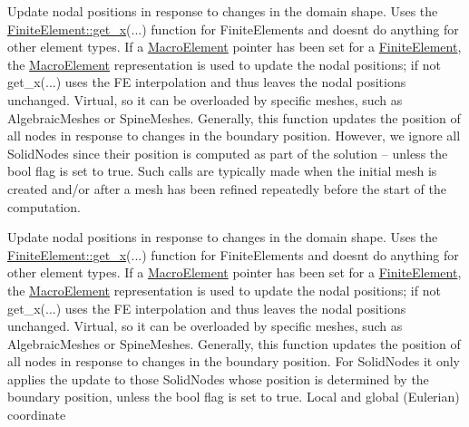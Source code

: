 Update nodal positions in response to changes in the domain shape. Uses the \hyperlink{classoomph_1_1FiniteElement_a6fc14cbf4e1d031acbc59b415cefa1ca}{Finite\+Element\+::get\+\_\+x}(...) function for Finite\+Elements and doesn\textquotesingle{}t do anything for other element types. If a \hyperlink{classoomph_1_1MacroElement}{Macro\+Element} pointer has been set for a \hyperlink{classoomph_1_1FiniteElement}{Finite\+Element}, the \hyperlink{classoomph_1_1MacroElement}{Macro\+Element} representation is used to update the nodal positions; if not get\+\_\+x(...) uses the FE interpolation and thus leaves the nodal positions unchanged. Virtual, so it can be overloaded by specific meshes, such as Algebraic\+Meshes or Spine\+Meshes. Generally, this function updates the position of all nodes in response to changes in the boundary position. However, we ignore all Solid\+Nodes since their position is computed as part of the solution -- unless the bool flag is set to true. Such calls are typically made when the initial mesh is created and/or after a mesh has been refined repeatedly before the start of the computation. 

Update nodal positions in response to changes in the domain shape. Uses the \hyperlink{classoomph_1_1FiniteElement_a6fc14cbf4e1d031acbc59b415cefa1ca}{Finite\+Element\+::get\+\_\+x}(...) function for Finite\+Elements and doesn\textquotesingle{}t do anything for other element types. If a \hyperlink{classoomph_1_1MacroElement}{Macro\+Element} pointer has been set for a \hyperlink{classoomph_1_1FiniteElement}{Finite\+Element}, the \hyperlink{classoomph_1_1MacroElement}{Macro\+Element} representation is used to update the nodal positions; if not get\+\_\+x(...) uses the FE interpolation and thus leaves the nodal positions unchanged. Virtual, so it can be overloaded by specific meshes, such as Algebraic\+Meshes or Spine\+Meshes. Generally, this function updates the position of all nodes in response to changes in the boundary position. For Solid\+Nodes it only applies the update to those Solid\+Nodes whose position is determined by the boundary position, unless the bool flag is set to true. Local and global (Eulerian) coordinate 

